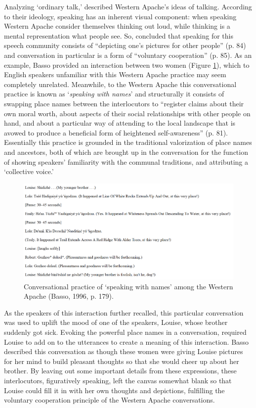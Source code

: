 \documentclass[12pt]{article}
\begin{document}
Analyzing `ordinary talk,' \textcite{basso1996} described Western Apache's ideas of talking. According to their ideology, speaking has an inherent visual component: when speaking Western Apache consider themselves thinking out loud, while thinking is a mental representation what people see. So, \textcite{basso1996} concluded that speaking for this speech community consists of ``depicting one's pictures for other people'' (p. 84) and conversation in particular is a form of ``voluntary cooperation'' (p. 85). As an example, Basso provided an interaction between two women (Figure \ref{speaking_names}), which to English speakers unfamiliar with this Western Apache practice may seem completely unrelated. Meanwhile, to the Western Apache this conversational practice is known as `\textit{speaking with names}' and structurally it consists of swapping place names between the interlocutors to ``register claims about their own moral worth, about aspects of their social relationships with other people on hand, and about a particular way of attending to the local landscape that is avowed to produce a beneficial form of heightened self-awareness'' (p. 81). Essentially this practice is grounded in the traditional valorization of place names and ancestors, both of which are brought up in the conversation for the function of showing speakers' familiarity with the communal traditions, and attributing a `collective voice.' 
\begin{figure}[ht]
\caption{Conversational practice of `speaking with names' among the Western Apache (Basso, 1996, p. 179).}
\label{speaking_names}
\includegraphics[width=7in]{speaking_names.png}
\end{figure}

As the speakers of this interaction further recalled, this particular conversation was used to uplift the mood of one of the speakers, Louise, whose brother suddenly got sick. Evoking the powerful place names in a conversation, required Louise to add on to the utterances to create a meaning of this interaction. Basso described this conversation as though these women were giving Louise pictures for her mind to build pleasant thoughts so that she would cheer up about her brother. By leaving out some important details from these expressions, these interlocutors, figuratively speaking, left the canvas somewhat blank so that Louise could fill it in with her own thoughts and depictions, fulfilling the voluntary cooperation principle of the Western Apache conversations. 
\end{document}
